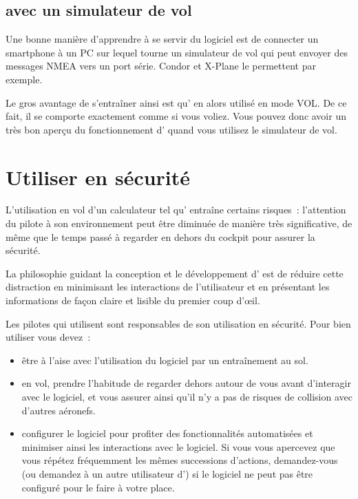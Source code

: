 \subsection*{\xc{} avec un simulateur de vol}
Une bonne manière d'apprendre à se servir du logiciel est de connecter un smartphone à un PC sur lequel tourne un simulateur de vol qui peut envoyer des messages NMEA vers un port série. Condor et X-Plane le permettent par exemple.

Le gros avantage de s'entraîner ainsi est qu'\xc{} en alors utilisé en mode VOL. De ce fait, il se comporte exactement comme si vous voliez. Vous pouvez donc avoir un très bon aperçu du fonctionnement d'\xc{} quand vous utilisez le simulateur de vol. 

\section{Utiliser \xc{} en sécurité}\label{sec:usingxcsoarsafely}\label{conf:usingxcsoarsafely}
L'utilisation en vol d'un calculateur tel qu'\xc{} entraîne certains risques~: l'attention du pilote à son environnement peut être diminuée de manière très significative, de même que le temps passé à regarder en dehors du cockpit pour assurer la sécurité.

La philosophie guidant la conception et le développement d'\xc{} est de réduire cette distraction en minimisant les interactions de l'utilisateur et en présentant les informations de façon claire et lisible du premier coup d'œil.

Les pilotes qui utilisent \xc sont responsables de son utilisation en sécurité. 
Pour bien utiliser \xc{} vous devez~:
\begin{itemize}
\item être à l'aise avec l'utilisation du logiciel par un entraînement au sol.
\item en vol, prendre l'habitude de regarder dehors autour de vous avant d'interagir avec le logiciel, et vous assurer ainsi qu'il n'y a pas de risques de collision avec d'autres aéronefs.
\item configurer le logiciel pour profiter des fonctionnalités automatisées et minimiser ainsi les interactions avec le logiciel. Si vous vous apercevez que vous répétez fréquemment les mêmes successions d'actions, demandez-vous (ou demandez à un autre utilisateur d'\xc) si le logiciel ne peut pas être configuré pour le faire à votre place.
\end{itemize}
